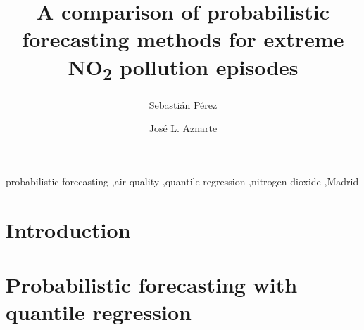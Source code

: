 \documentclass[a4paper,twocolumn,5p]{elsarticle}
\begin{document}
\newcommand{\no}{NO\textsubscript{2}\xspace}

\begin{frontmatter}

\title{A comparison of probabilistic forecasting methods for extreme \no pollution episodes}

\author{Sebasti\'an P\'erez}
\address{(afiliaci\'on y direcci\'on)}

\author{Jos\'e L. Aznarte}
\address{Artificial Intelligence Department\\Universidad Nacional de
  Educaci\'on a Distancia --- UNED\\c/ Juan del Rosal, 16, Madrid, Spain}



\begin{abstract}

\end{abstract}

\begin{keyword}
probabilistic forecasting \sep air quality \sep quantile regression
\sep nitrogen dioxide \sep Madrid
\end{keyword}

\end{frontmatter}


\section{Introduction}
\label{sec:intro}



\section{Probabilistic forecasting with quantile regression}
\label{sec:probForec}
\end{document}
